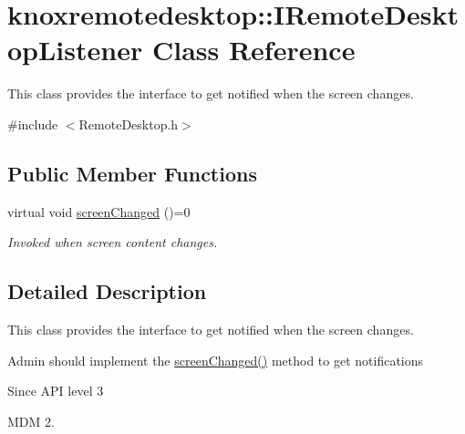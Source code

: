 \hypertarget{classknoxremotedesktop_1_1IRemoteDesktopListener}{\section{knoxremotedesktop\-:\-:\-I\-Remote\-Desktop\-Listener \-Class \-Reference}
\label{classknoxremotedesktop_1_1IRemoteDesktopListener}
}


\-This class provides the interface to get notified when the screen changes.  




{\ttfamily \#include $<$\-Remote\-Desktop.\-h$>$}

\subsection*{\-Public \-Member \-Functions}
\begin{DoxyCompactItemize}
\item 
virtual void \hyperlink{classknoxremotedesktop_1_1IRemoteDesktopListener_a737ab352cec0a7dc249da5519a8e14b0}{screen\-Changed} ()=0
\begin{DoxyCompactList}\small\item\em \-Invoked when screen content changes. \end{DoxyCompactList}\end{DoxyCompactItemize}


\subsection{\-Detailed \-Description}
\-This class provides the interface to get notified when the screen changes. 

\-Admin should implement the \hyperlink{classknoxremotedesktop_1_1IRemoteDesktopListener_a737ab352cec0a7dc249da5519a8e14b0}{screen\-Changed()} method to get notifications

\begin{DoxySince}{\-Since}
\-A\-P\-I level 3 

\-M\-D\-M 2. 
\end{DoxySince}


